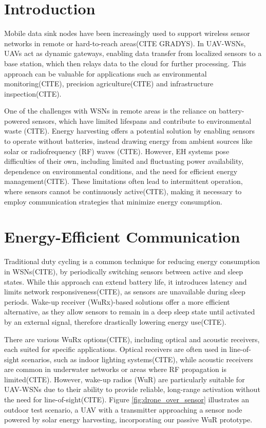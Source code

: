 \documentclass[conference]{IEEEtran}
\begin{document}
\section{Introduction}

Mobile data sink nodes have been increasingly used to support wireless sensor networks in remote or hard-to-reach areas(CITE GRADYS). In UAV-WSNs, UAVs act as dynamic gateways, enabling data transfer from localized sensors to a base station, which then relays data to the cloud for further processing. This approach can be valuable for applications such as environmental monitoring(CITE), precision agriculture(CITE) and infrastructure inspection(CITE).

One of the challenges with WSNs in remote areas is the reliance on battery-powered sensors, which have limited lifespans and contribute to environmental waste (CITE). Energy harvesting offers a potential solution by enabling sensors to operate without batteries, instead drawing energy from ambient sources like solar or radiofrequency (RF) waves (CITE). However, EH systems pose difficulties of their own, including limited and fluctuating power availability, dependence on environmental conditions, and the need for efficient energy management(CITE). These limitations often lead to intermittent operation, where sensors cannot be continuously active(CITE), making it necessary to employ communication strategies that minimize energy consumption.

\section{Energy-Efficient Communication}

Traditional duty cycling is a common technique for reducing energy consumption in WSNs(CITE), by periodically switching sensors between active and sleep states. While this approach can extend battery life, it introduces latency and limits network responsiveness(CITE), as sensors are unavailable during sleep periods. Wake-up receiver (WuRx)-based solutions offer a more efficient alternative, as they allow sensors to remain in a deep sleep state until activated by an external signal, therefore drastically lowering energy use(CITE).

There are various WuRx options(CITE), including optical and acoustic receivers, each suited for specific applications. Optical receivers are often used in line-of-sight scenarios, such as indoor lighting systems(CITE), while acoustic receivers are common in underwater networks or areas where RF propagation is limited(CITE). However, wake-up radios (WuR) are particularly suitable for UAV-WSNs due to their ability to provide reliable, long-range activation without the need for line-of-sight(CITE). Figure \ref{fig:drone_over_sensor} illustrates an outdoor test scenario, a UAV with a transmitter approaching a sensor node powered by solar energy harvesting, incorporating our passive WuR prototype.
\end{document}
